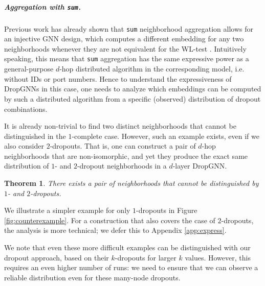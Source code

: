 \documentclass{article}
\newtheorem{theorem}{Theorem}
\begin{document}
\subparagraph*{Aggregation with \texttt{sum}.}

Previous work has already shown that \texttt{sum} neighborhood aggregation allows for an injective GNN design, which computes a different embedding for any two neighborhoods whenever they are not equivalent for the WL-test \citep{GIN}. Intuitively speaking, this means that \texttt{sum} aggregation has the same expressive power as a general-purpose $d$-hop distributed algorithm in the corresponding model, i.e. without IDs or port numbers. Hence to understand the expressiveness of DropGNNs in this case, one needs to analyze which embeddings can be computed by such a distributed algorithm from a specific (observed) distribution of dropout combinations.

It is already non-trivial to find two distinct neighborhoods that cannot be distinguished in the $1$-complete case. However, such an example exists, even if we also consider $2$-dropouts. That is, one can construct a pair of $d$-hop neighborhoods that are non-isomorphic, and yet they produce the exact same distribution of $1$- and $2$-dropout neighborhoods in a $d$-layer DropGNN.

\begin{theorem} \label{th:counter}
There exists a pair of neighborhoods that cannot be distinguished by $1$- and $2$-dropouts.
\end{theorem}

We illustrate a simpler example for only $1$-dropouts in Figure \ref{fig:counterexample}. For a construction that also covers the case of $2$-dropouts, the analysis is more technical; we defer this to Appendix \ref{app:express}.

We note that even these more difficult examples can be distinguished with our dropout approach, based on their $k$-dropouts for larger $k$ values. However, this requires an even higher number of runs: we need to ensure that we can observe a reliable distribution even for these many-node dropouts.
\end{document}
